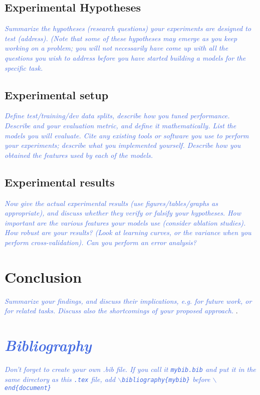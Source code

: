\documentclass[11pt,letterpaper]{article}
\newcommand{\blue}[1]{\textcolor{RoyalBlue}{#1}}
\newcommand{\instructions}[1]{\blue{\textit{#1}}}
\begin{document}
\subsection{Experimental Hypotheses}
\label{sec:exper-hypoth}
\instructions{Summarize the hypotheses (research questions) your experiments are designed to test (address). (Note that some of these hypotheses may emerge as you keep working on a problem; you will not necessarily have come up with all the questions you wish to address before you have started building a models for the specific task.}

\subsection{Experimental setup}
\label{sec:experimental-setup}
\instructions{Define test/training/dev data splits, describe how you tuned performance. Describe and your evaluation metric, and define it mathematically.
List the models you will evaluate. Cite any existing tools or software you use to perform your experiments; describe what you implemented yourself. Describe how you obtained the features used by each of the models.}

\subsection{Experimental results}
\label{sec:experimental-results}
\instructions{Now give the actual experimental results (use figures/tables/graphs as appropriate), and discuss whether they verify or falsify your hypotheses. How important are the various features your models use (consider ablation studies). How robust are your results? (Look at learning curves, or the variance when you perform cross-validation). Can you perform an error analysis?}

\section{Conclusion}
\instructions{Summarize your findings, and discuss their implications, e.g. for future work, or for related tasks. Discuss also the shortcomings of your proposed approach. }. 

\section*{\instructions{Bibliography}}
\instructions{Don't forget to create your own .bib file. If you call it {\tt mybib.bib} and put it in the same directory as this {\tt .tex} file, add {\tt$\backslash$bibliography\{mybib\}} before {\tt$\backslash$end\{document\}}
}
%
\end{document}

